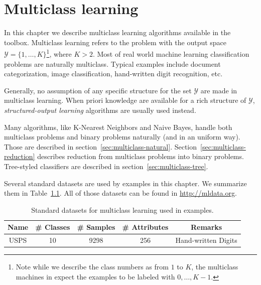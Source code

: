 %

\chapter{Multiclass learning}

In this chapter we describe multiclass learning algorithms available in the 
\shogun{} toolbox.  Multiclass learning refers to the problem with the output 
space $\mathcal{Y}=\{1,\ldots,K\}$\footnote{Note while we describe the class 
	numbers as from $1$ to $K$, the multiclass machines in \shogun{} expect 
	the examples to be labeled with $0,\ldots,K-1$.}, where $K>2$.  Most of 
real world machine learning classification problems are naturally multiclass.   
Typical examples include document categorization, image classification, 
hand-written digit recognition, etc.  

Generally, no assumption of any specific structure for the set $\mathcal{Y}$
are made in multiclass learning.  When priori knowledge are available for a
rich structure of $\mathcal{Y}$, \emph{structured-output learning} algorithms
are usually used instead.

Many algorithms, like K-Nearest Neighbors and Naive Bayes, handle both 
multiclass problems and binary problems naturally (and in an uniform way). 
Those are described in section~\ref{sec:multiclass-natural}. 
Section~\ref{sec:multiclass-reduction} describes reduction from multiclass 
problems into binary problems. Tree-styled classifiers are described in 
section~\ref{sec:multiclass-tree}.

Several standard datasets are used by examples in this chapter. We summarize
them in Table~\ref{tab:multiclass-dataset}. All of those datasets can be found
in \url{http://mldata.org}.

\begin{table}[t]\centering
	\begin{tabular}{ccccc}
		\toprule
		Name & \# Classes & \# Samples & \# Attributes & Remarks \\
		\midrule
		USPS & 10         & 9298       & 256           & Hand-written Digits \\
		\bottomrule
	\end{tabular}
	\caption{Standard datasets for multiclass learning used in examples.}
	\label{tab:multiclass-dataset}
\end{table}

